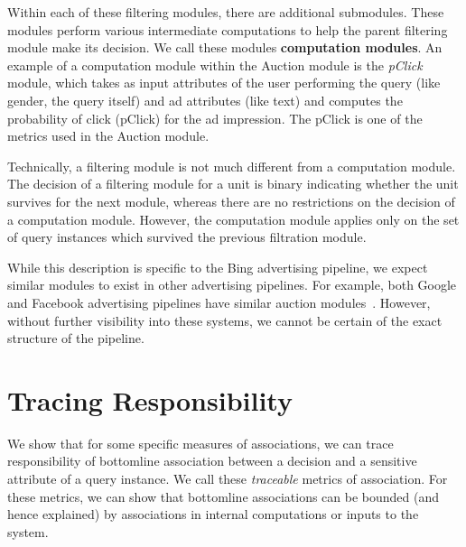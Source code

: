 \documentclass[10pt, onecolumn]{report}
\begin{document}
Within each of these filtering modules, there are additional submodules. These modules
perform various intermediate computations to help the parent filtering module
make its decision. We call these modules \textbf{computation modules}. 
An example of a computation module within the Auction module is the \emph{pClick} 
module, which takes as input attributes of the user performing the query 
(like gender, the query itself) and ad attributes (like text) and computes the 
probability of click (pClick) for the ad impression. 
The pClick is one of the metrics used in the Auction module. 

Technically, a filtering module is not much different from a computation module. 
The decision of a filtering module for a unit is binary indicating whether
the unit survives for the next module, whereas there are no restrictions
on the decision of a computation module. However, the computation module 
applies only on the set of query instances which survived the previous filtration module.

While this description is specific to the Bing advertising pipeline, we expect similar
modules to exist in other advertising pipelines. For example, both Google and Facebook 
advertising pipelines have similar auction 
modules~\cite{google-auction, facebook-auction}. However, without further
visibility into these systems, we cannot be certain of the exact 
structure of the pipeline. 

\section{Tracing Responsibility}\label{sec:tracing}

We show that for some specific measures of associations, we can trace responsibility
of bottomline association between a decision and a sensitive 
attribute of a query instance. 
We call these \emph{traceable} metrics of association. 
For these metrics, we can show that bottomline associations 
can be bounded (and hence explained) by associations in internal computations 
or inputs to the system. 

\end{document}
